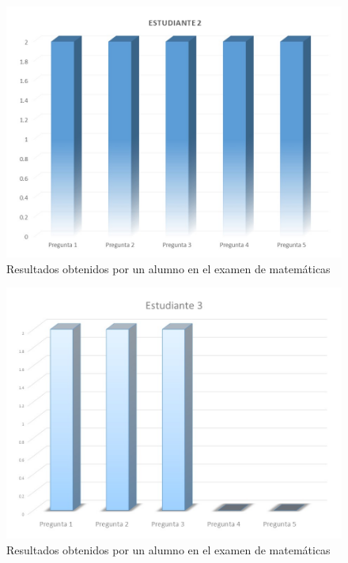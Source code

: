 \documentclass[12pt] {report}
\begin{document}
\begin{figure}[H]
\centering 
\includegraphics[scale=.4]{MEstudiante2.JPG}
\caption{Resultados obtenidos por un alumno en el examen de matemáticas}
\end{figure}
\begin{figure}[H]
\centering 
\includegraphics[scale=.4]{MEstudiante3.JPG}
\caption{Resultados obtenidos por un alumno en el examen de matemáticas}
\end{figure}
\end{document}
